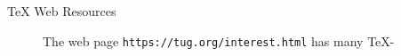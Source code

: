 \documentclass[12pt]{article}
\begin{document}
\pdfinterwordspaceon

\begin{description}
\item[\TeX{} Web Resources] The web page
\texttt{https://tug.org/interest.html} has many \TeX{}-
\end{description}

\loggingall
\end{document}

